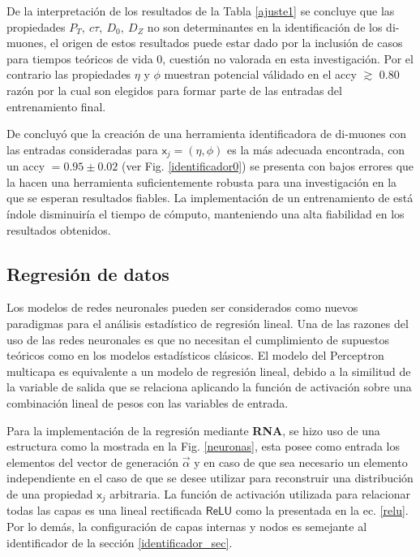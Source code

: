De la interpretación de los resultados de la Tabla \ref{ajuste1} se concluye que las propiedades $P_T, ~ c\tau, ~ D_0, ~D_Z$ no son determinantes en la identificación de los di-muones, el origen de estos resultados puede estar dado por la inclusión de casos para tiempos teóricos de vida 0, cuestión no valorada en esta investigación. Por el contrario las propiedades $\eta$ y $\phi$ muestran potencial válidado en el \textsf{accy} $\gtrsim$ 0.80 razón por la cual son elegidos para formar parte de las entradas del entrenamiento final. 

De concluyó que la creación de una herramienta identificadora de di-muones con las entradas consideradas para $\textsf{x}_j=(\eta,\phi)$ es la más adecuada encontrada, con un \textsf{accy} $= 0.95 \pm 0.02$ (ver Fig. \ref{identificador0}) se presenta con bajos errores que la hacen una herramienta suficientemente robusta para una investigación en la que se esperan resultados fiables. La implementación de un entrenamiento de está índole disminuiría el tiempo de cómputo, manteniendo una alta fiabilidad en los resultados obtenidos.


\subsection{Regresión de datos}

Los modelos de redes neuronales pueden ser considerados como nuevos paradigmas para el análisis estadístico de regresión lineal. Una de las razones del uso de las redes neuronales es que no necesitan el cumplimiento de supuestos teóricos como en los modelos estadísticos clásicos. El modelo del Perceptron multicapa es equivalente a un modelo de regresión lineal, debido a la similitud de la variable de salida que se relaciona aplicando la función de activación sobre una combinación lineal de pesos con las variables de entrada. 

Para la implementación de la regresión mediante \textbf{RNA}, se hizo uso de una estructura como la mostrada en la Fig. \ref{neuronas}, esta posee como entrada los elementos del vector de generación $\vec{\alpha}$ y en caso de que sea necesario un elemento independiente en el caso de que se desee utilizar para reconstruir una distribución de una propiedad $\textsf{x}_j$ arbitraria. La función de activación utilizada para relacionar todas las capas es una lineal rectificada $\textsf{ReLU}$ como la presentada en la ec. \ref{relu}. Por lo demás, la configuración de capas internas y nodos es semejante al identificador de la sección \ref{identificador_sec}.%


